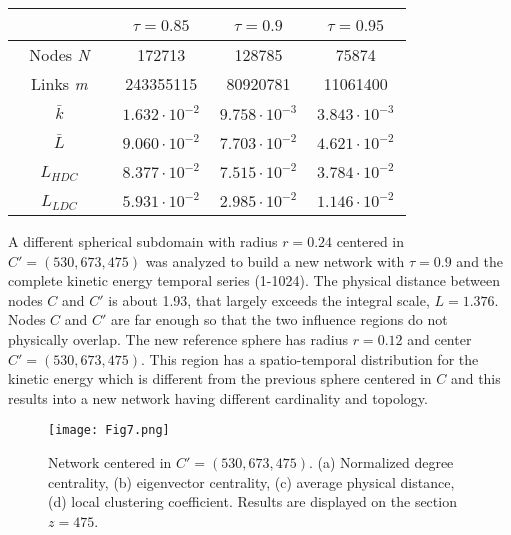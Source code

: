 \documentclass{ws-ijbc}
\begin{document}
\begin{table}[h]
{\begin{tabular}{|c|c|c|c|}
  \hline
   \,\,\, \,\,\, & \,\,\, $\tau=0.85$ \,\,\, & \,\,\, $\tau=0.9$ \,\,\, & \,\,\, $\tau=0.95$ \,\,\, \\
   \hline
  \,\,\, Nodes \emph{N} \,\,\, & 172713 & 128785 & 75874 \\
   \hline
  \,\,\, Links \emph{m} \,\,\, & 243355115 & 80920781 & 11061400 \\
   \hline
  \,\,\, $\bar{k}$ \,\,\, & $1.632 \cdot 10^{-2}$ & $9.758 \cdot 10^{-3}$ & $3.843 \cdot 10^{-3}$ \\
   \hline
  \,\,\, $\bar{L}$ \,\,\, & $9.060 \cdot 10^{-2}$ & $7.703 \cdot 10^{-2}$ &  $4.621 \cdot 10^{-2}$ \\
   \hline
  \,\,\, $L_{HDC}$ \,\,\, & $8.377 \cdot 10^{-2}$ & $7.515 \cdot 10^{-2}$ & $3.784 \cdot 10^{-2}$ \\
   \hline
  \,\,\, $L_{LDC}$ \,\,\, & $5.931 \cdot 10^{-2}$ & $2.985 \cdot 10^{-2}$ & $1.146 \cdot 10^{-2}$ \\
  \hline
\end{tabular}}
\end{table}

A different spherical subdomain with radius $r=0.24$ centered in $C'=(530,673,475)$ was analyzed to build a new network with $\tau=0.9$ and the complete kinetic energy temporal series (1-1024). The physical distance between nodes $C$ and $C'$ is about 1.93, that largely exceeds the integral scale, $L = 1.376$. Nodes $C$ and $C'$ are far enough so that the two influence regions do not physically overlap. The new reference sphere has radius $r=0.12$ and center $C'=(530,673,475)$. This region has a spatio-temporal distribution for the kinetic energy which is different from the previous sphere centered in $C$ and this results into a new network having different cardinality and topology.

\begin{figure}[h]
\texttt{[image: Fig7.png]}
\caption{Network centered in $C'=(530,673,475)$. (a) Normalized degree centrality, (b) eigenvector centrality, (c) average physical distance, (d) local clustering coefficient. Results are displayed on the section $z=475$.}
\end{figure}
\end{document}
